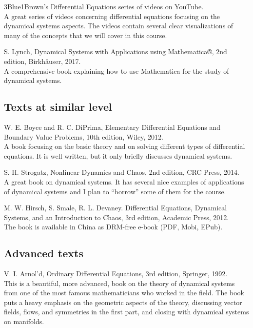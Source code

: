 \documentclass[11pt]{article}
\newcommand{\push}{\hangpara{2em}{1}}
\begin{document}
\push 3Blue1Brown’s Differential Equations series of videos on YouTube. \\
A great series of videos concerning differential equations focusing on the dynamical systems aspects. The videos contain several clear visualizations of many of the concepts that we will cover in this course.

\push S. Lynch, Dynamical Systems with Applications using Mathematica®, 2nd edition, Birkhäuser, 2017. \\
A comprehensive book explaining how to use Mathematica for the study of dynamical systems.

\subsection{Texts at similar level}

\push W. E. Boyce and R. C. DiPrima, Elementary Differential Equations and Boundary Value Problems, 10th edition, Wiley, 2012. \\
A book focusing on the basic theory and on solving different types of differential equations. It is well written, but it only briefly discusses dynamical systems. 

\push S. H. Strogatz, Nonlinear Dynamics and Chaos, 2nd edition, CRC Press, 2014. \\
A great book on dynamical systems. It has several nice examples of applications of dynamical systems and I plan to “borrow” some of them for the course.

\push M. W. Hirsch, S. Smale, R. L. Devaney. Differential Equations, Dynamical Systems, and an Introduction to Chaos, 3rd edition, Academic Press, 2012. \\
The book is available in China as DRM-free e-book (PDF, Mobi, EPub). 


\subsection{Advanced texts}

\push V. I. Arnol’d, Ordinary Differential Equations, 3rd edition, Springer, 1992. \\
This is a beautiful, more advanced, book on the theory of dynamical systems from one of the most famous mathematicians who worked in the field. The book puts a heavy emphasis on the geometric aspects of the theory, discussing vector fields, flows, and symmetries in the first part, and closing with dynamical systems on manifolds.
\end{document}
